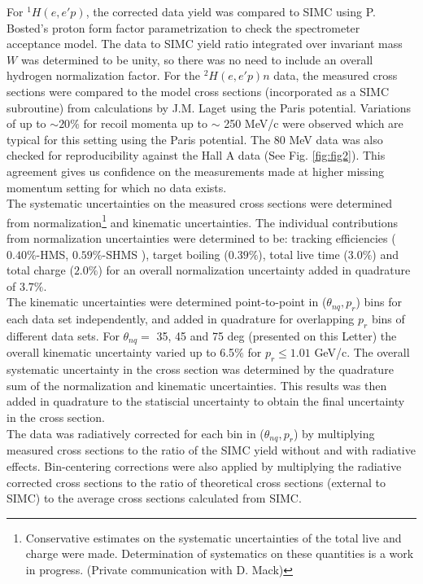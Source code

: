 For $^{1}H(e,e'p)$, the corrected data yield was compared to SIMC using P. Bosted's proton form factor parametrization\cite{PhysRevC.51.409} to check the spectrometer acceptance
model. The data to SIMC yield ratio integrated over invariant mass $W$ was determined to be unity, so there was no need to include an overall hydrogen normalization factor. For the $^{2}H(e,e'p)n$ data,
the measured cross sections were compared to the model cross sections (incorporated as a SIMC subroutine) from calculations by J.M. Laget using the Paris potential. Variations
of up to $\sim 20 \%$ for recoil momenta up to $\sim$ 250 MeV/c were observed which are typical for this setting using the Paris potential. The 80 MeV data was also checked for reproducibility against the Hall A data (See Fig. \ref{fig:fig2}).
This agreement gives us confidence on the measurements made at higher missing momentum setting for which no data exists. \\
\indent The systematic uncertainties on the measured cross sections were determined from normalization\footnote{Conservative estimates on the systematic uncertainties of the total live and charge were made. Determination of systematics on these quantities is a work in progress. (Private communication with D. Mack)} and kinematic uncertainties. The individual contributions from normalization uncertainties
were determined to be: tracking efficiencies ($0.40 \%$-HMS, $0.59 \%$-SHMS ), target boiling ($0.39 \%$), total live time ($3.0 \%$) and total charge ($2.0\%$)
for an overall normalization uncertainty added in quadrature of $3.7 \%$. \\
\indent The kinematic uncertainties were determined point-to-point in ($\theta_{nq}, p_{r}$) bins for each data set independently, and added in quadrature for overlapping $p_{r}$ bins
of different data sets. For $\theta_{nq}=$ 35, 45 and 75 deg (presented on this Letter) the overall kinematic uncertainty varied up to 6.5$\%$ for $p_{r}\leq1.01$ GeV/c.
The overall systematic uncertainty in the cross section was determined by the quadrature sum of the normalization and kinematic uncertainties. This results was then added in quadrature
to the statiscial uncertainty to obtain the final uncertainty in the cross section. \\
\indent The data was radiatively corrected for each bin in ($\theta_{nq}, p_{r}$) by multiplying measured cross sections to the ratio of the SIMC yield without and with radiative effects. Bin-centering
corrections were also applied by multiplying the radiative corrected cross sections to the ratio of theoretical cross sections (external to SIMC) to the average cross sections calculated from SIMC.
